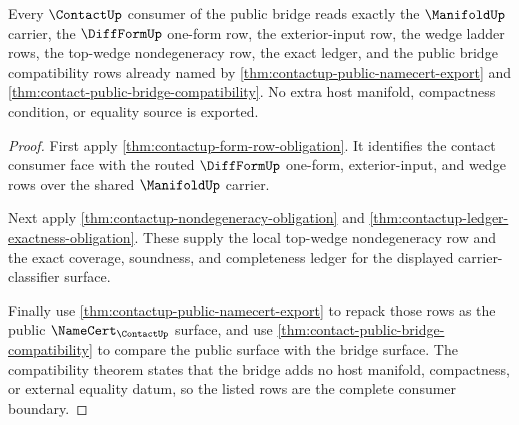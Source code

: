 \begin{theorem}
\label{thm:contactup-mature-consumer-completeness}
Every $\ContactUp$ consumer of the public bridge reads exactly the
$\ManifoldUp$ carrier, the $\DiffFormUp$ one-form row, the exterior-input row,
the wedge ladder rows, the top-wedge nondegeneracy row, the exact ledger, and
the public bridge compatibility rows already named by
\autoref{thm:contactup-public-namecert-export} and
\autoref{thm:contact-public-bridge-compatibility}. No extra host manifold,
compactness condition, or equality source is exported.
\end{theorem}
\begin{proof}
First apply \autoref{thm:contactup-form-row-obligation}. It identifies the
contact consumer face with the routed $\DiffFormUp$ one-form, exterior-input,
and wedge rows over the shared $\ManifoldUp$ carrier.

Next apply \autoref{thm:contactup-nondegeneracy-obligation} and
\autoref{thm:contactup-ledger-exactness-obligation}. These supply the local
top-wedge nondegeneracy row and the exact coverage, soundness, and completeness
ledger for the displayed carrier-classifier surface.

Finally use \autoref{thm:contactup-public-namecert-export} to repack those rows
as the public $\NameCert_{\ContactUp}$ surface, and use
\autoref{thm:contact-public-bridge-compatibility} to compare the public surface
with the bridge surface. The compatibility theorem states that the bridge adds
no host manifold, compactness, or external equality datum, so the listed rows
are the complete consumer boundary.
\end{proof}


